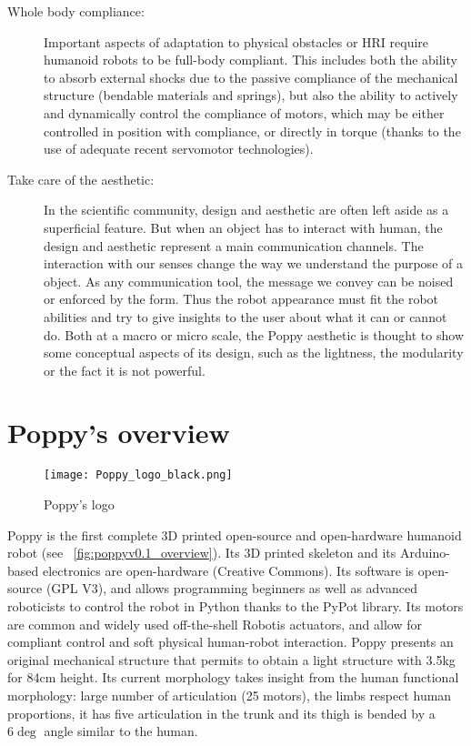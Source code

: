 \begin{description}
    \item[Whole body compliance:] Important aspects of adaptation to physical obstacles or HRI require humanoid robots to be full-body compliant. This includes both the ability to absorb external shocks due to the passive compliance of the mechanical structure (bendable materials and springs), but also the ability to actively and dynamically control the compliance of motors, which may be either controlled in position with compliance, or directly in torque (thanks to the use of adequate recent servomotor technologies).

    \item[Take care of the aesthetic:] In the scientific community, design and aesthetic are often left aside as a superficial feature. But when an object has to interact with human, the design and aesthetic represent a main communication channels. The interaction with our senses change the way we understand the purpose of a object. As any communication tool, the message we convey can be noised or enforced by the form. Thus the robot appearance must fit the robot abilities and try to give insights to the user about what it can or cannot do.
    Both at a macro or micro scale, the Poppy aesthetic is thought to show some conceptual aspects of its design, such as the lightness, the modularity or the fact it is not powerful.

\end{description}

\section{Poppy's overview} %

\begin{figure}[tb]
    \begin{center}
        \texttt{[image: Poppy\_logo\_black.png]}
    \end{center}
    \caption{Poppy's logo}
    \label{fig:poppy_logo}
\end{figure}

Poppy is the first complete 3D printed open-source and open-hardware humanoid robot (see \figurename~\ref{fig:poppyv0.1_overview}). Its 3D printed skeleton and its Arduino-based electronics are open-hardware (Creative Commons). Its software is open-source (GPL V3), and allows programming beginners as well as advanced roboticists to control the robot in Python thanks to the PyPot library. Its motors are common and widely used off-the-shell Robotis actuators, and allow for compliant control and soft physical human-robot interaction. Poppy presents an original mechanical structure that permits to obtain a light structure with 3.5kg for 84cm height.
Its current morphology takes insight from the human functional morphology: large number of articulation (25 motors), the limbs respect human proportions, it has five articulation in the trunk and its thigh is bended by a $6\deg$ angle similar to the human.

